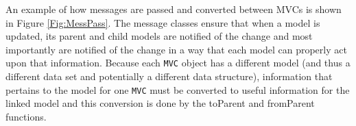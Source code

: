 \documentclass[11pt]{article}
\newcommand{\Rfunction}[1]{{\textsf{#1}}}
\newcommand{\Robject}[1]{{\texttt{#1}}}
\newcommand{\Rslot}[1]{\textsl{#1}}
\newcommand{\Rclass}[1]{\texttt{#1}}
\begin{document}


An example of how messages are passed and converted between MVCs 
is shown in Figure \ref{Fig:MessPass}.  The message classes ensure 
that when a model is updated, its parent and child models are notified 
of the change and most importantly are notified of the change in a way that
each model can properly act upon that information.  Because each
\Robject{MVC} object has a different model (and thus a different data
set and potentially a different data structure), information that
pertains to the model for one \Robject{MVC} must be converted to
useful information for the linked model and this conversion is done by
the \Rfunction{toParent} and \Rfunction{fromParent} functions.
\end{document}
